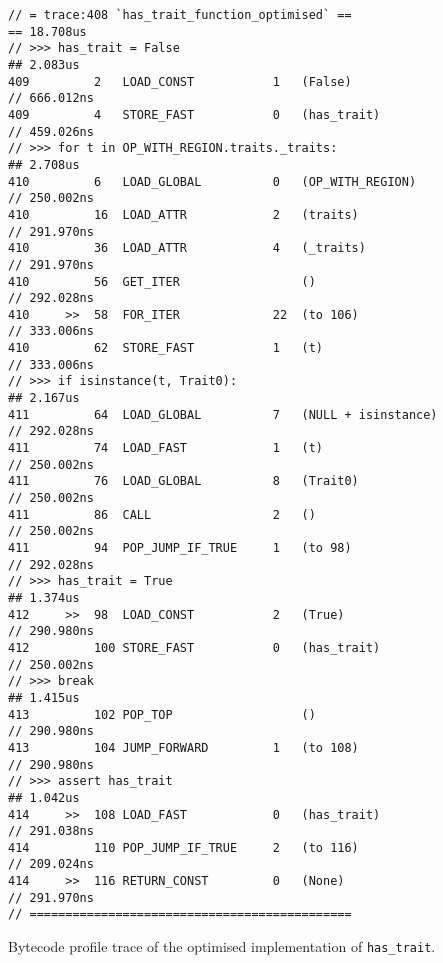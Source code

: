 \begin{code}
\begin{verbatim}
// = trace:408 `has_trait_function_optimised` ==                      == 18.708us
// >>> has_trait = False                                              ## 2.083us
409         2   LOAD_CONST           1   (False)                      // 666.012ns
409         4   STORE_FAST           0   (has_trait)                  // 459.026ns
// >>> for t in OP_WITH_REGION.traits._traits:                        ## 2.708us
410         6   LOAD_GLOBAL          0   (OP_WITH_REGION)             // 250.002ns
410         16  LOAD_ATTR            2   (traits)                     // 291.970ns
410         36  LOAD_ATTR            4   (_traits)                    // 291.970ns
410         56  GET_ITER                 ()                           // 292.028ns
410     >>  58  FOR_ITER             22  (to 106)                     // 333.006ns
410         62  STORE_FAST           1   (t)                          // 333.006ns
// >>> if isinstance(t, Trait0):                                      ## 2.167us
411         64  LOAD_GLOBAL          7   (NULL + isinstance)          // 292.028ns
411         74  LOAD_FAST            1   (t)                          // 250.002ns
411         76  LOAD_GLOBAL          8   (Trait0)                     // 250.002ns
411         86  CALL                 2   ()                           // 250.002ns
411         94  POP_JUMP_IF_TRUE     1   (to 98)                      // 292.028ns
// >>> has_trait = True                                               ## 1.374us
412     >>  98  LOAD_CONST           2   (True)                       // 290.980ns
412         100 STORE_FAST           0   (has_trait)                  // 250.002ns
// >>> break                                                          ## 1.415us
413         102 POP_TOP                  ()                           // 290.980ns
413         104 JUMP_FORWARD         1   (to 108)                     // 290.980ns
// >>> assert has_trait                                               ## 1.042us
414     >>  108 LOAD_FAST            0   (has_trait)                  // 291.038ns
414         110 POP_JUMP_IF_TRUE     2   (to 116)                     // 209.024ns
414     >>  116 RETURN_CONST         0   (None)                       // 291.970ns
// =============================================
    \end{verbatim}
    \caption{Bytecode profile trace of the optimised implementation of \texttt{has_trait}.}
    \label{listing:bytecode-profiles-hastrait-optimised}
\end{code}
